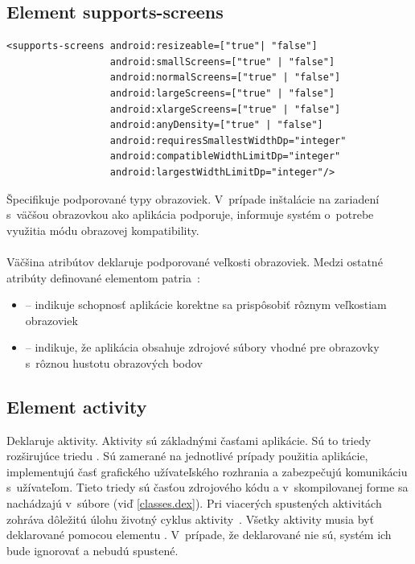 \subsection{Element supports-screens}
\lstset{language=XML}
\begin{lstlisting}
<supports-screens android:resizeable=["true"| "false"]
                  android:smallScreens=["true" | "false"]
                  android:normalScreens=["true" | "false"]
                  android:largeScreens=["true" | "false"]
                  android:xlargeScreens=["true" | "false"]
                  android:anyDensity=["true" | "false"]
                  android:requiresSmallestWidthDp="integer"
                  android:compatibleWidthLimitDp="integer"
                  android:largestWidthLimitDp="integer"/>
\end{lstlisting}
Špecifikuje podporované typy obrazoviek. V~prípade inštalácie na zariadení s~väčšou obrazovkou ako aplikácia podporuje, informuje systém o~potrebe využitia módu obrazovej kompatibility.\\\\ Väčšina atribútov deklaruje podporované veľkosti obrazoviek. Medzi ostatné atribúty definované elementom  patria~\cite{elScreen}:\\
\begin{itemize}
\item {} -- indikuje schopnosť aplikácie korektne sa prispôsobiť rôznym veľkostiam obrazoviek
\item {} -- indikuje, že aplikácia obsahuje zdrojové súbory vhodné pre obrazovky s~rôznou hustotu obrazových bodov
\end{itemize}

\subsection{Element activity}
\label{el_activity}
Deklaruje aktivity. Aktivity sú základnými časťami aplikácie. Sú to triedy rozširujúce triedu . Sú zamerané na jednotlivé prípady použitia aplikácie, implementujú časť grafického užívateľského rozhrania a zabezpečujú komunikáciu s~užívateľom. Tieto triedy sú časťou zdrojového kódu a v~skompilovanej forme sa nachádzajú v~súbore  (viď \ref{classes.dex}). Pri viacerých spustených aktivitách zohráva dôležitú úlohu životný cyklus aktivity~\cite{elActivity}. Všetky aktivity musia byť deklarované pomocou elementu . V~prípade, že deklarované nie sú, systém ich bude ignorovať a nebudú spustené.

